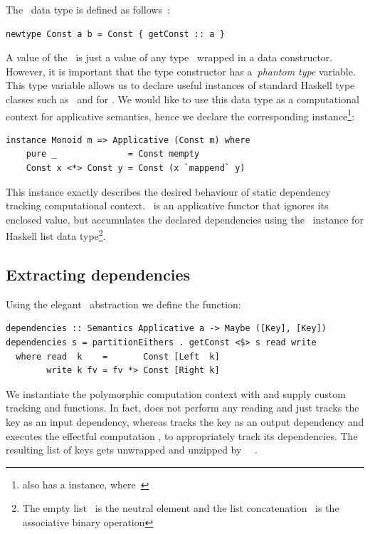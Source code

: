 The~ data type is defined as follows~\cite{Mcbride:2008:APE:1348940.1348941}:

\begin{verbatim}
newtype Const a b = Const { getConst :: a }
\end{verbatim}

\noindent
A value of the~ is just a value of any type~
wrapped in a data constructor. However, it is important that the type constructor
has a~\emph{phantom type} variable. This type variable allows us to
declare useful instances of standard Haskell type classes such as~
and  for . We would like to use this data type as a
computational context for applicative semantics, hence we declare the
corresponding instance\footnote{ also has a  instance,
where~}:

\begin{verbatim}
instance Monoid m => Applicative (Const m) where
    pure _              = Const mempty
    Const x <*> Const y = Const (x `mappend` y)
\end{verbatim}

This instance exactly describes the desired behaviour of static dependency tracking
computational context.~ is an applicative functor that ignores
its enclosed value, but accumulates the declared dependencies using the~
instance for Haskell list data type\footnote{The empty list~\hs{[]} is the
neutral element and the list concatenation~\hs{(++)} is the associative binary operation}.

\subsection{Extracting dependencies}

Using the elegant~ abstraction we define the  function:

\begin{verbatim}
dependencies :: Semantics Applicative a -> Maybe ([Key], [Key])
dependencies s = partitionEithers . getConst <$> s read write
  where read  k    =       Const [Left  k]
        write k fv = fv *> Const [Right k]
\end{verbatim}

\noindent
We instantiate the polymorphic computation context with 
and supply custom tracking  and  functions. In fact, 
does not perform any reading and just tracks the key as an input dependency,
whereas  tracks the key as an output dependency and executes the
effectful computation , to appropriately track its dependencies. The
resulting list of keys gets unwrapped and unzipped by
~~.

